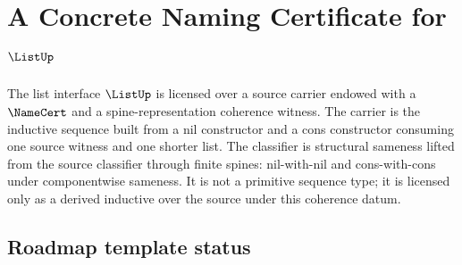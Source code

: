 \chapter{A Concrete Naming Certificate for \(\ListUp\)}
\label{ch:concrete-instances-list-namecert}

The list interface $\ListUp$ is licensed over a source carrier endowed with a $\NameCert$ and a spine-representation coherence witness. The carrier is the inductive sequence built from a nil constructor and a cons constructor consuming one source witness and one shorter list. The classifier is structural sameness lifted from the source classifier through finite spines: nil-with-nil and cons-with-cons under componentwise sameness. It is not a primitive sequence type; it is licensed only as a derived inductive over the source under this coherence datum.

\section{Roadmap template status}

